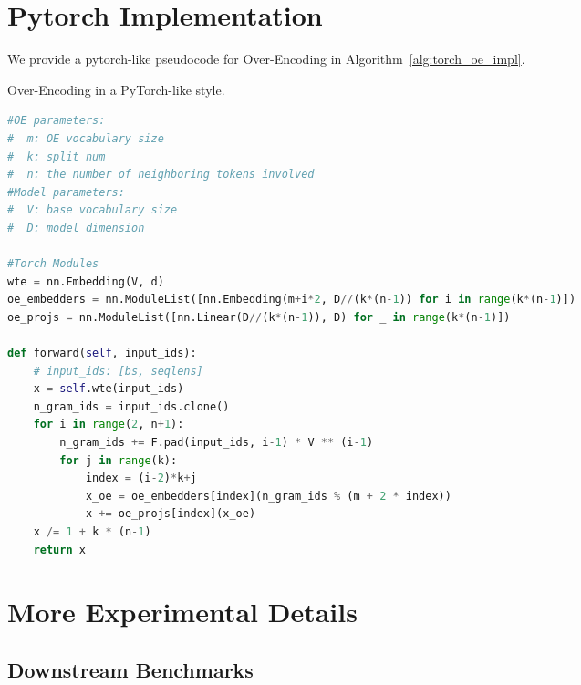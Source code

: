 

\section{Pytorch Implementation}
\label{sec:implementation}

We provide a pytorch-like pseudocode for Over-Encoding in Algorithm~\ref{alg:torch_oe_impl}.

\begin{algorithm}[h]
\caption{Over-Encoding in a PyTorch-like style.}
\label{alg:torch_oe_impl}

\begin{lstlisting}[language=python]
#OE parameters:
#  m: OE vocabulary size
#  k: split num
#  n: the number of neighboring tokens involved
#Model parameters:
#  V: base vocabulary size
#  D: model dimension

#Torch Modules
wte = nn.Embedding(V, d)
oe_embedders = nn.ModuleList([nn.Embedding(m+i*2, D//(k*(n-1)) for i in range(k*(n-1)])
oe_projs = nn.ModuleList([nn.Linear(D//(k*(n-1)), D) for _ in range(k*(n-1)])

def forward(self, input_ids):
    # input_ids: [bs, seqlens]
    x = self.wte(input_ids)
    n_gram_ids = input_ids.clone()
    for i in range(2, n+1):
        n_gram_ids += F.pad(input_ids, i-1) * V ** (i-1)
        for j in range(k):
            index = (i-2)*k+j
            x_oe = oe_embedders[index](n_gram_ids % (m + 2 * index))
            x += oe_projs[index](x_oe)
    x /= 1 + k * (n-1)
    return x

\end{lstlisting}
\end{algorithm}


\section{More Experimental Details}
\label{sec:appendix_more_exps}

\subsection{Downstream Benchmarks}
\label{sec:appendix_detailed_benchmark_desc}

